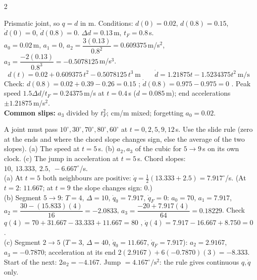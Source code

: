 \begin{multicols}{2}
\begin{examq}
\solution
Prismatic joint, so $q=d$ in m. Conditions: $d(0)=0.02$, $d(0.8)=0.15$, $\dot d(0)=0$, $\dot d(0.8)=0$. $\Delta d=0.13$\,m, $t_F=0.8$\,s.\\
$a_0=0.02$\,m, $a_1=0$, $a_2=\dfrac{3(0.13)}{0.8^2}=0.609375$\,m/s$^2$, $a_3=\dfrac{-2(0.13)}{0.8^3}=-0.5078125$\,m/s$^3$.
\[\boxed{d(t)=0.02+0.609375\,t^2-0.5078125\,t^3\ \text{m}}\qquad \dot d=1.21875t-1.5234375t^2\ \text{m/s}\]
Check: $d(0.8)=0.02+0.39-0.26=0.15$ \checkmark; $\dot d(0.8)=0.975-0.975=0$ \checkmark. Peak speed $1.5\Delta d/t_F=0.24375$\,m/s at $t=0.4$\,s ($d=0.085$\,m); end accelerations $\pm1.21875$\,m/s$^2$. \chk\\
\textbf{Common slips:} $a_3$ divided by $t_F^2$; cm/m mixed; forgetting $a_0=0.02$.
\end{examq}

\begin{examq}
A joint must pass $10^\circ,30^\circ,70^\circ,80^\circ,60^\circ$ at $t=0,2,5,9,12$\,s. Use the slide rule (zero at the ends and where the chord slope changes sign, else the average of the two slopes). (a) The speed at $t=5$\,s. (b) $a_2,a_3$ of the cubic for $5\to9$\,s on its own clock. (c) The jump in acceleration at $t=5$\,s.
\solution
Chord slopes: $10,\ 13.333,\ 2.5,\ -6.667^\circ$/s.\\
(a) At $t=5$ both neighbours are positive: $\dot q=\tfrac12(13.333+2.5)=7.917^\circ$/s. (At $t=2$: $11.667$; at $t=9$ the slope changes sign: $0$.)\\
(b) Segment $5\to9$: $T=4$, $\Delta=10$, $\dot q_0=7.917$, $\dot q_F=0$: $a_0=70$, $a_1=7.917$, $a_2=\dfrac{30-(15.833)(4)}{16}=-2.0833$, $a_3=\dfrac{-20+7.917(4)}{64}=0.18229$. Check $q(4)=70+31.667-33.333+11.667=80$ \checkmark, $\dot q(4)=7.917-16.667+8.750=0$ \checkmark.\\
(c) Segment $2\to5$ ($T=3$, $\Delta=40$, $\dot q_0=11.667$, $\dot q_F=7.917$): $a_2=2.9167$, $a_3=-0.7870$; acceleration at its end $2(2.9167)+6(-0.7870)(3)=-8.333$. Start of the next: $2a_2=-4.167$. Jump $=\boxed{4.167^\circ/\text{s}^2}$: the rule gives continuous $q,\dot q$ only. \chk
\end{examq}


\end{multicols}
